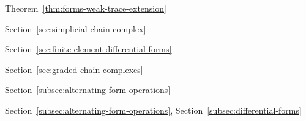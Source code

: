 \par\noindent\hspace*{1em}\label{index:trace-operator-on-h-lambda}\quad Theorem~\ref{thm:forms-weak-trace-extension}

\par\noindent\hspace*{0em}\label{index:triangulation}\quad Section~\ref{sec:simplicial-chain-complex}

\par\noindent\hspace*{0em}\label{index:unisolvence}\quad Section~\ref{sec:finite-element-differential-forms}

\par\noindent\hspace*{0em}\label{index:vector-space-graded}\quad Section~\ref{sec:graded-chain-complexes}

\par\noindent\hspace*{0em}\label{index:volume-form}\quad Section~\ref{subsec:alternating-form-operations}

\par\noindent\hspace*{0em}\label{index:wedge-product}\quad Section~\ref{subsec:alternating-form-operations}, Section~\ref{subsec:differential-forms}
\par\endgroup
